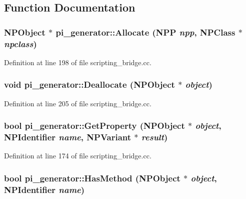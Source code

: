 \subsection{Function Documentation}
\hypertarget{namespacepi__generator_a94f67bed2d50304566aa1f7c35f91ab2}{
\subsubsection[{Allocate}]{\setlength{\rightskip}{0pt plus 5cm}NPObject $\ast$ pi\_\-generator::Allocate (NPP {\em npp}, \/  NPClass $\ast$ {\em npclass})}}
\label{namespacepi__generator_a94f67bed2d50304566aa1f7c35f91ab2}


Definition at line 198 of file scripting\_\-bridge.cc.

\hypertarget{namespacepi__generator_a36cb8ad170a393eedf2f477fa7561f62}{
\subsubsection[{Deallocate}]{\setlength{\rightskip}{0pt plus 5cm}void pi\_\-generator::Deallocate (NPObject $\ast$ {\em object})}}
\label{namespacepi__generator_a36cb8ad170a393eedf2f477fa7561f62}


Definition at line 205 of file scripting\_\-bridge.cc.

\hypertarget{namespacepi__generator_aa945b983b43a437de8e06ebbbe8f6064}{
\subsubsection[{GetProperty}]{\setlength{\rightskip}{0pt plus 5cm}bool pi\_\-generator::GetProperty (NPObject $\ast$ {\em object}, \/  NPIdentifier {\em name}, \/  NPVariant $\ast$ {\em result})}}
\label{namespacepi__generator_aa945b983b43a437de8e06ebbbe8f6064}


Definition at line 174 of file scripting\_\-bridge.cc.

\hypertarget{namespacepi__generator_a952c6436fb4cc8d87e830f81f3bae284}{
\subsubsection[{HasMethod}]{\setlength{\rightskip}{0pt plus 5cm}bool pi\_\-generator::HasMethod (NPObject $\ast$ {\em object}, \/  NPIdentifier {\em name})}}
\label{namespacepi__generator_a952c6436fb4cc8d87e830f81f3bae284}


